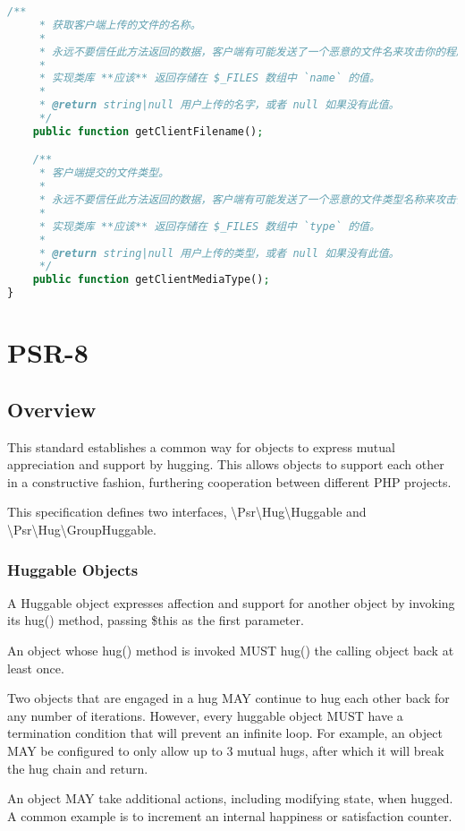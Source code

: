 \begin{lstlisting}[language=PHP]
    /**
     * 获取客户端上传的文件的名称。
     * 
     * 永远不要信任此方法返回的数据，客户端有可能发送了一个恶意的文件名来攻击你的程序。
     * 
     * 实现类库 **应该** 返回存储在 $_FILES 数组中 `name` 的值。
     *
     * @return string|null 用户上传的名字，或者 null 如果没有此值。
     */
    public function getClientFilename();

    /**
     * 客户端提交的文件类型。
     * 
     * 永远不要信任此方法返回的数据，客户端有可能发送了一个恶意的文件类型名称来攻击你的程序。
     *
     * 实现类库 **应该** 返回存储在 $_FILES 数组中 `type` 的值。
     *
     * @return string|null 用户上传的类型，或者 null 如果没有此值。
     */
    public function getClientMediaType();
}
\end{lstlisting}

\chapter{PSR-8}


\section{Overview}

This standard establishes a common way for objects to express mutual appreciation and support by hugging. This allows objects to support each other in a constructive fashion, furthering cooperation between different PHP projects.

This specification defines two interfaces, \textbackslash Psr\textbackslash Hug\textbackslash Huggable and \textbackslash Psr\textbackslash Hug\textbackslash GroupHuggable.

\subsection{Huggable Objects}

\begin{compactenum}
\item A Huggable object expresses affection and support for another object by invoking its hug() method, passing \$this as the first parameter.

\item An object whose hug() method is invoked MUST hug() the calling object back at least once.

\item Two objects that are engaged in a hug MAY continue to hug each other back for any number of iterations. However, every huggable object MUST have a termination condition that will prevent an infinite loop. For example, an object MAY be configured to only allow up to 3 mutual hugs, after which it will break the hug chain and return.

\item An object MAY take additional actions, including modifying state, when hugged. A common example is to increment an internal happiness or satisfaction counter.

\end{compactenum}

